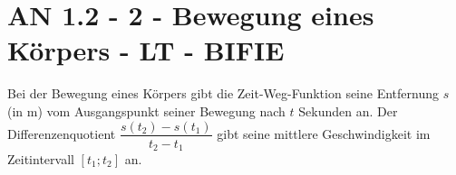 \section{AN 1.2 - 2 - Bewegung eines Körpers - LT - BIFIE}


\begin{beispiel}[AN 1.2]{1} %
Bei der Bewegung eines Körpers gibt die Zeit-Weg-Funktion seine Entfernung $s$ (in m) vom Ausgangspunkt seiner Bewegung nach $t$ Sekunden an. 
Der Differenzenquotient $\dfrac{s(t_2)-s(t_1)}{t_2-t_1}$ gibt seine mittlere Geschwindigkeit im Zeitintervall $[t_1;t_2]$ an.

\end{beispiel}